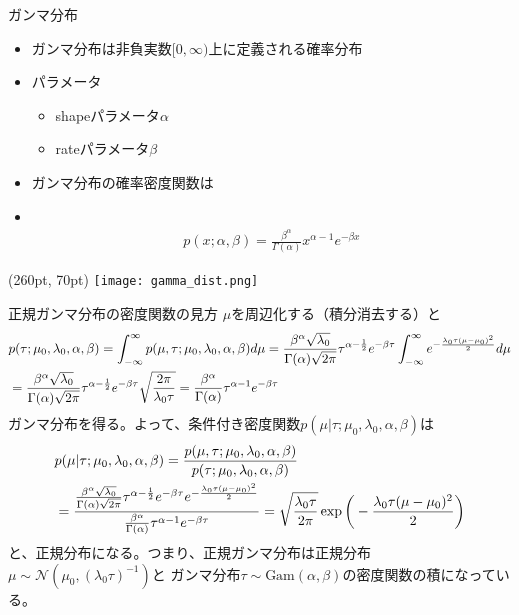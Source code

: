 \documentclass[aspectratio=169,unicode,dvipdfmx,14pt]{beamer}
\begin{document}
\begin{frame}{ガンマ分布}
\begin{itemize}
\item ガンマ分布は非負実数$[0,\infty)$上に定義される確率分布
\item パラメータ
\begin{itemize}
\item shapeパラメータ$\alpha$
\item rateパラメータ$\beta$
\end{itemize}
\item ガンマ分布の確率密度関数は
\item[] \
\begin{align}
p(x;\alpha,\beta)=\frac{\beta^\alpha}{\Gamma(\alpha)}x^{\alpha-1}e^{-\beta x}
\end{align}
\end{itemize}
\begin{textblock*}{0.4\linewidth}(260pt, 70pt)
    \centering
    \texttt{[image: gamma\_dist.png]}
\end{textblock*}
\end{frame}

\begin{frame}{正規ガンマ分布の密度関数の見方}
\FontMath
$\mu$を周辺化する（積分消去する）と
\begin{align}
& p(\tau ; \mu_0, \lambda_0, \alpha, \beta) = \int_{-\infty}^\infty p(\mu, \tau ; \mu_0, \lambda_0, \alpha, \beta) d\mu
= \frac{\beta^\alpha\sqrt{\lambda_0}}{\Gamma(\alpha)\sqrt{2\pi}}
\tau^{\alpha-\frac{1}{2}}e^{-\beta\tau}
\int_{-\infty}^\infty e^{-\frac{\lambda_0\tau(\mu - \mu_0)^2}{2}} d\mu
\notag \\ &
= \frac{\beta^\alpha\sqrt{\lambda_0}}{\Gamma(\alpha)\sqrt{2\pi}}
\tau^{\alpha-\frac{1}{2}}e^{-\beta\tau}
\sqrt{ \frac{2\pi}{\lambda_0\tau} }
= \frac{\beta^\alpha}{\Gamma(\alpha)}
\tau^{\alpha-1}e^{-\beta\tau}
\end{align}
ガンマ分布を得る。よって、条件付き密度関数$p(\mu | \tau ; \mu_0, \lambda_0, \alpha, \beta)$は
\begin{align}
& p(\mu | \tau ; \mu_0, \lambda_0, \alpha, \beta)
= \frac{ p(\mu, \tau ; \mu_0, \lambda_0, \alpha, \beta) }{ p(\tau ; \mu_0, \lambda_0, \alpha, \beta) }
\notag \\ &
= \frac{ \frac{\beta^\alpha\sqrt{\lambda_0}}{\Gamma(\alpha)\sqrt{2\pi}}
\tau^{\alpha-\frac{1}{2}}e^{-\beta\tau}e^{-\frac{\lambda_0\tau(\mu - \mu_0)^2}{2}} }
{ \frac{\beta^\alpha}{\Gamma(\alpha)}
\tau^{\alpha-1}e^{-\beta\tau} }
= \sqrt{ \frac{ \lambda_0\tau }{ 2\pi } } \exp\bigg( - \frac{\lambda_0\tau(\mu - \mu_0)^2}{2} \bigg)
\end{align}
と、正規分布になる。つまり、正規ガンマ分布は正規分布$\mu \sim \mathcal{N}(\mu_0, (\lambda_0\tau)^{-1})$と
ガンマ分布$\tau \sim \mbox{Gam}(\alpha, \beta)$の密度関数の積になっている。
\end{frame}
\end{document}
